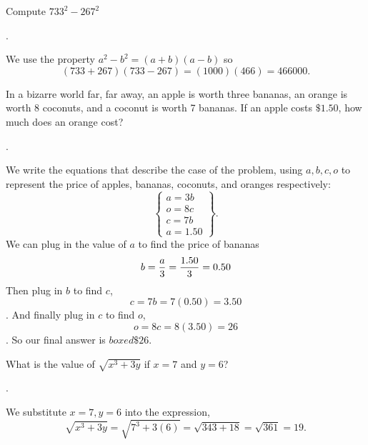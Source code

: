 \documentclass[11pt]{article}
\DeclareRobustCommand{\frac}[3][0pt]{%
  {\begingroup\hspace{#1}#2\hspace{#1}\endgroup\over\hspace{#1}#3\hspace{#1}}}
\begin{document}

\begin{problem}
Compute $733^2-267^2$
\end{problem}
\begin{answer}
.
\end{answer}
\begin{solution}
We use the property $a^2-b^2 = (a+b)(a-b)$ so
$$(733+267)(733-267) = (1000)(466) = \boxed{466000}.$$
\end{solution}

\begin{problem}In a bizarre world far, far away, an apple is worth three bananas, an orange is worth 8 coconuts, and a coconut is worth 7 bananas. If an apple costs $\$1.50$, how much does an orange cost?
\end{problem}
\begin{answer}
.
\end{answer}
\begin{solution}
We write the equations that describe the case of the problem, using $a, b, c, o$ to represent the price of apples, bananas, coconuts, and oranges respectively:
 \[
    \left\{
                \begin{array}{ll}
                  a=3b\\
                  o=8c\\
                  c=7b \\
a=1.50
                \end{array}
              \right\}.
  \]
We can plug in the value of $a$ to find the price of bananas
$$b=\frac{a}{3} = \frac{1.50}{3} = 0.50$$
Then plug in $b$ to find $c$,
$$c=7b = 7(0.50) = 3.50$$.
And finally plug in $c$ to find $o$,
$$o=8c=8(3.50)=26$$.
So our final answer is $boxed{\$ 26}$.
\end{solution}


\begin{problem}What is the value of $\sqrt{x^{3}+3y}$ if $x=7$ and $y=6$?
\end{problem}
\begin{answer}
.
\end{answer}
\begin{solution}
We substitute $x=7, y=6$ into the expression,
$$\sqrt{x^{3}+3y}=\sqrt{7^3+3(6)}=\sqrt{343+18}=\sqrt{361}=\boxed{19}.$$
\end{solution}
\end{document}
